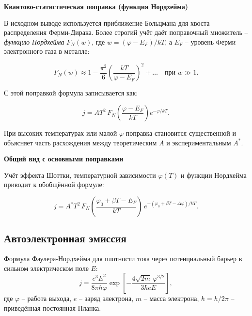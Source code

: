\documentclass[12pt]{article}
\begin{document}

\vspace{0.5cm}

\textbf{Квантово-статистическая поправка (функция Нордхейма)}

В исходном выводе используется приближение Больцмана для хвоста распределения Ферми-Дирака. Более строгий учёт даёт поправочный множитель -- \emph{функцию Нордхейма} $F_N(w)$, где $w = (\varphi - E_F)/kT$, а $E_F$ -- уровень Ферми электронного газа в металле:

\begin{equation}
    F_N(w) \approx 1 - \frac{\pi^2}{6} \left(\frac{kT}{\varphi - E_F}\right)^2 + \ldots \quad \text{при } w \gg 1.
    \label{eq:nordheim_func}
\end{equation}

С этой поправкой формула записывается как:

\begin{equation}
    j = A T^2 \, F_N\!\left(\frac{\varphi - E_F}{kT}\right) e^{-\varphi/kT}.
    \label{eq:richardson_nordheim}
\end{equation}

При высоких температурах или малой $\varphi$ поправка становится существенной и объясняет часть расхождения между теоретическим $A$ и экспериментальным $A^*$.

\vspace{0.5cm}

\textbf{Общий вид с основными поправками}

Учёт эффекта Шоттки, температурной зависимости $\varphi(T)$ и функции Нордхейма приводит к обобщённой формуле:

\begin{equation}
    j = A^* T^2 \, F_N\!\left(\frac{\varphi_0 + \beta T - E_F}{kT}\right) 
        \, e^{-(\varphi_0 + \beta T - \Delta\varphi)/kT}.
    \label{eq:richardson_general}
\end{equation}


\subsection*{Автоэлектронная эмиссия}
Формула Фаулера-Нордхейма для плотности тока через потенциальный барьер в сильном электрическом поле $E$:
\begin{equation}
    j = \frac{e^3 E^2}{8\pi h \varphi} \exp\left[-\frac{4\sqrt{2m}\,\varphi^{3/2}}{3\hbar e E}\right],
    \label{eq:fn_emission}
\end{equation}
где $\varphi$ -- работа выхода, $e$ -- заряд электрона, $m$ -- масса электрона, $\hbar = h/2\pi$ -- приведённая постоянная Планка.
\end{document}
